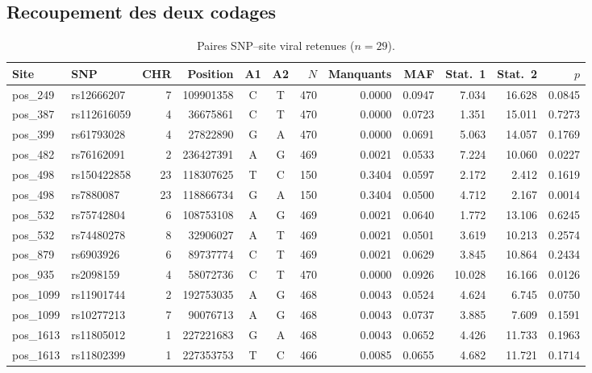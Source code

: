\documentclass[11pt,a4paper]{article}
\begin{document}
\subsection{Recoupement des deux codages}

\begin{table}[h!]
  \centering
  \footnotesize
  \caption{Paires SNP--site viral retenues ($n = 29$).}
  \label{tab:snp_site_virus}
  \begin{tabular}{llrrccrrrrrr}
    \toprule
    Site & SNP & CHR & Position & A1 & A2 & $N$ & Manquants & MAF & Stat.~1 & Stat.~2 & $p$ \\
    \midrule
    pos\_249  & rs12666207  & 7  & 109901358 & C & T & 470 & 0.0000 & 0.0947 & 7.034  & 16.628 & 0.0845 \\
    pos\_387  & rs112616059 & 4  & 36675861  & C & T & 470 & 0.0000 & 0.0723 & 1.351  & 15.011 & 0.7273 \\
    pos\_399  & rs61793028  & 4  & 27822890  & G & A & 470 & 0.0000 & 0.0691 & 5.063  & 14.057 & 0.1769 \\
    pos\_482  & rs76162091  & 2  & 236427391 & A & G & 469 & 0.0021 & 0.0533 & 7.224  & 10.060 & 0.0227 \\
    pos\_498  & rs150422858 & 23 & 118307625 & T & C & 150 & 0.3404 & 0.0597 & 2.172  & 2.412  & 0.1619 \\
    pos\_498  & rs7880087   & 23 & 118866734 & G & A & 150 & 0.3404 & 0.0500 & 4.712  & 2.167  & 0.0014 \\
    pos\_532  & rs75742804  & 6  & 108753108 & A & G & 469 & 0.0021 & 0.0640 & 1.772  & 13.106 & 0.6245 \\
    pos\_532  & rs74480278  & 8  & 32906027  & A & T & 469 & 0.0021 & 0.0501 & 3.619  & 10.213 & 0.2574 \\
    pos\_879  & rs6903926   & 6  & 89737774  & C & T & 469 & 0.0021 & 0.0629 & 3.845  & 10.864 & 0.2434 \\
    pos\_935  & rs2098159   & 4  & 58072736  & C & T & 470 & 0.0000 & 0.0926 & 10.028 & 16.166 & 0.0126 \\
    pos\_1099 & rs11901744  & 2  & 192753035 & A & G & 468 & 0.0043 & 0.0524 & 4.624  & 6.745  & 0.0750 \\
    pos\_1099 & rs10277213  & 7  & 90076713  & A & G & 468 & 0.0043 & 0.0737 & 3.885  & 7.609  & 0.1591 \\
    pos\_1613 & rs11805012  & 1  & 227221683 & G & A & 468 & 0.0043 & 0.0652 & 4.426  & 11.733 & 0.1963 \\
    pos\_1613 & rs11802399  & 1  & 227353753 & T & C & 466 & 0.0085 & 0.0655 & 4.682  & 11.721 & 0.1714 \\

\end{tabular}
\end{table}
\end{document}
